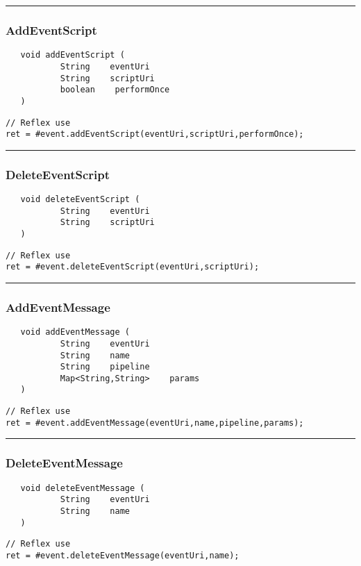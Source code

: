 \rule{15cm}{2pt}
\subsubsection{AddEventScript}
\label{Api:AddEventScript}
\begin{verbatim}
   void addEventScript (
           String    eventUri
           String    scriptUri
           boolean    performOnce
   )
\end{verbatim}
\begin{lstlisting}[language=reflex]
// Reflex use
ret = #event.addEventScript(eventUri,scriptUri,performOnce);
\end{lstlisting}



\rule{15cm}{2pt}
\subsubsection{DeleteEventScript}
\label{Api:DeleteEventScript}
\begin{verbatim}
   void deleteEventScript (
           String    eventUri
           String    scriptUri
   )
\end{verbatim}
\begin{lstlisting}[language=reflex]
// Reflex use
ret = #event.deleteEventScript(eventUri,scriptUri);
\end{lstlisting}



\rule{15cm}{2pt}
\subsubsection{AddEventMessage}
\label{Api:AddEventMessage}
\begin{verbatim}
   void addEventMessage (
           String    eventUri
           String    name
           String    pipeline
           Map<String,String>    params
   )
\end{verbatim}
\begin{lstlisting}[language=reflex]
// Reflex use
ret = #event.addEventMessage(eventUri,name,pipeline,params);
\end{lstlisting}



\rule{15cm}{2pt}
\subsubsection{DeleteEventMessage}
\label{Api:DeleteEventMessage}
\begin{verbatim}
   void deleteEventMessage (
           String    eventUri
           String    name
   )
\end{verbatim}
\begin{lstlisting}[language=reflex]
// Reflex use
ret = #event.deleteEventMessage(eventUri,name);
\end{lstlisting}




